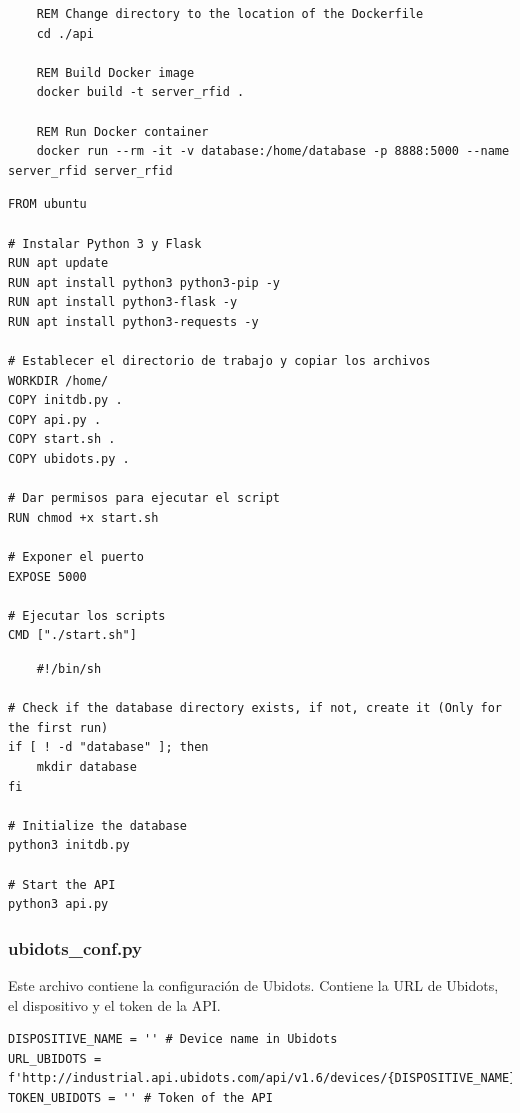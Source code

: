 \documentclass{article}
\begin{document}
\begin{lstlisting}
	REM Change directory to the location of the Dockerfile
	cd ./api
	
	REM Build Docker image
	docker build -t server_rfid .
	
	REM Run Docker container
	docker run --rm -it -v database:/home/database -p 8888:5000 --name server_rfid server_rfid	
\end{lstlisting}

\begin{lstlisting}
FROM ubuntu

# Instalar Python 3 y Flask
RUN apt update
RUN apt install python3 python3-pip -y
RUN apt install python3-flask -y
RUN apt install python3-requests -y

# Establecer el directorio de trabajo y copiar los archivos
WORKDIR /home/
COPY initdb.py .
COPY api.py .
COPY start.sh .
COPY ubidots.py .

# Dar permisos para ejecutar el script
RUN chmod +x start.sh

# Exponer el puerto
EXPOSE 5000

# Ejecutar los scripts
CMD ["./start.sh"]

\end{lstlisting}

\begin{lstlisting}
	#!/bin/sh

# Check if the database directory exists, if not, create it (Only for the first run)
if [ ! -d "database" ]; then
    mkdir database
fi

# Initialize the database
python3 initdb.py

# Start the API
python3 api.py
\end{lstlisting}

\subsubsection{ubidots\_conf.py}
Este archivo contiene la configuración de Ubidots.
Contiene la URL de Ubidots, el dispositivo y el token de la API.
\begin{lstlisting}
DISPOSITIVE_NAME = '' # Device name in Ubidots
URL_UBIDOTS = f'http://industrial.api.ubidots.com/api/v1.6/devices/{DISPOSITIVE_NAME}/'
TOKEN_UBIDOTS = '' # Token of the API
\end{lstlisting}
\end{document}
